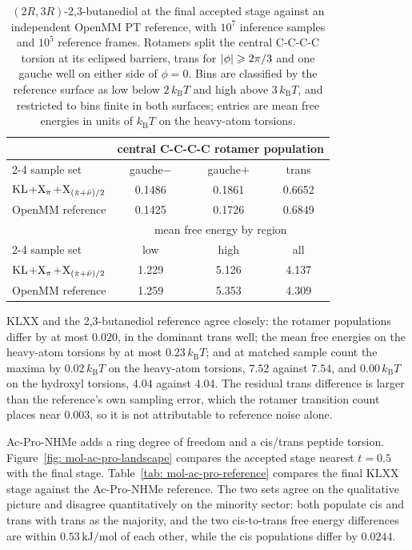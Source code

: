 \documentclass{article}
\begin{document}
\begin{table}[htb]
\centering
\small
\begin{tabular}{lccc}
\toprule
& \multicolumn{3}{c}{central C-C-C-C rotamer population} \\
\cmidrule(l){2-4}
sample set & gauche\(-\) & gauche\(+\) & trans \\
\midrule
$\mathrm{KL}$+$\mathrm{X}_\pi$+$\mathrm{X}_{(\hat\pi+\bar\nu)/2}$ & 0.1486 & 0.1861 & 0.6652 \\
OpenMM reference & 0.1425 & 0.1726 & 0.6849 \\
\midrule
& \multicolumn{3}{c}{mean free energy by region} \\
\cmidrule(l){2-4}
sample set & low & high & all \\
\midrule
$\mathrm{KL}$+$\mathrm{X}_\pi$+$\mathrm{X}_{(\hat\pi+\bar\nu)/2}$ & 1.229 & 5.126 & 4.137 \\
OpenMM reference & 1.259 & 5.353 & 4.309 \\
\bottomrule
\end{tabular}
\caption{\((2R,3R)\)-2,3-butanediol at the final accepted stage against an independent OpenMM PT reference, with \(10^7\) inference samples and \(10^5\) reference frames. Rotamers split the central C-C-C-C torsion at its eclipsed barriers, trans for \(|\phi|\geqslant2\pi/3\) and one gauche well on either side of \(\phi=0\). Bins are classified by the reference surface as low below \(2\,k_{\mathrm B}T\) and high above \(3\,k_{\mathrm B}T\), and restricted to bins finite in both surfaces; entries are mean free energies in units of \(k_{\mathrm B}T\) on the heavy-atom torsions.}
\label{tab: mol-butanediol-reference}
\end{table}

KLXX and the 2,3-butanediol reference agree closely: the rotamer populations differ by at most \(0.020\), in the dominant trans well; the mean free energies on the heavy-atom torsions by at most \(0.23\,k_{\mathrm B}T\); and at matched sample count the maxima by \(0.02\,k_{\mathrm B}T\) on the heavy-atom torsions, \(7.52\) against \(7.54\), and \(0.00\,k_{\mathrm B}T\) on the hydroxyl torsions, \(4.04\) against \(4.04\). The residual trans difference is larger than the reference's own sampling error, which the rotamer transition count places near \(0.003\), so it is not attributable to reference noise alone.

Ac-Pro-NHMe adds a ring degree of freedom and a cis/trans peptide torsion. Figure~\ref{fig: mol-ac-pro-landscape} compares the accepted stage nearest \(t=0.5\) with the final stage.
Table~\ref{tab: mol-ac-pro-reference} compares the final KLXX stage against the Ac-Pro-NHMe reference. The two sets agree on the qualitative picture and disagree quantitatively on the minority sector: both populate cis and trans with trans as the majority, and the two cis-to-trans free energy differences are within \(0.53\,\mathrm{kJ/mol}\) of each other, while the cis populations differ by \(0.0244\).
\end{document}

